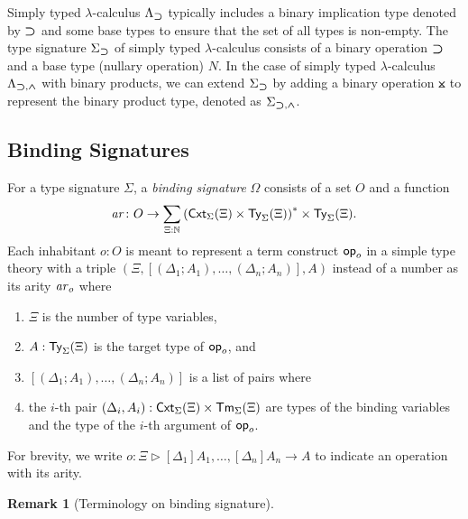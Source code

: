 \documentclass[acmsmall,screen]{acmart}
\theoremstyle{acmdefinition}
\newtheorem{remark}[theorem]{Remark}}
\begin{document}
\begin{example}\label{ex:implication}
  Simply typed $\lambda$-calculus $\Lambda_{\mathbin{\bm{\supset}}}$ typically includes a binary implication type denoted by $\mathbin{\bm{\supset}}$ and some base types to ensure that the set of all types is non-empty.
  The type signature $\Sigma_{\mathbin{\bm{\supset}}}$ of simply typed $\lambda$-calculus consists of a binary operation $\mathbin{\bm{\supset}}$ and a base type (nullary operation) $N$.
  In the case of simply typed $\lambda$-calculus $\Lambda_{\mathbin{\bm{\supset}}, \mathbin{\bm{\wedge}}}$ with binary products, we can extend $\Sigma_{\mathbin{\bm{\supset}}}$ by adding a binary operation $\btimes$ to represent the binary product type, denoted as $\Sigma_{\mathbin{\bm{\supset}}, \mathbin{\bm{\wedge}}}$.
\end{example}

\subsection{Binding Signatures} \label{subsec:binding-sig}
\begin{definition}\label{def:binding-signature}
  For a type signature $\Sigma$, a \emph{binding signature} $\Omega$ consists of a set $O$ and a function
  \[
    \mathit{ar}\colon O \to \sum_{\Xi : \mathbb{N}} \left(\mathsf{Cxt}_\Sigma(\Xi) \times \mathsf{Ty}_\Sigma(\Xi)\right)^* \times \mathsf{Ty}_\Sigma(\Xi).
  \]
  Each inhabitant $o: O$ is meant to represent a term construct $\mathsf{op}_o$ in a simple type theory with a triple $\left(\Xi, \left[\left(\Delta_1; A_1\right), \ldots, \left(\Delta_{n}; A_{n}\right) \right], A\right)$
  instead of a number as its arity $\mathit{ar}_o$ where
  \begin{enumerate}
    \item $\Xi$ is the number of type variables, 
    \item $A : \mathsf{Ty}_\Sigma(\Xi)$ is the target type of $\mathsf{op}_o$, and
    \item $\left[\left(\Delta_1; A_{1}\right), \ldots, \left(\Delta_{n}; A_{n}\right) \right]$ is a list of pairs where
    \item the $i$-th pair $(\Delta_i, A_i) :\mathsf{Cxt}_{\Sigma}(\Xi) \times \mathsf{Tm}_{\Sigma}(\Xi)$ are types of the binding variables and the type of the $i$-th argument of $\mathsf{op}_{o}$.
  \end{enumerate}
  For brevity, we write $o \colon \Xi \rhd [\Delta_1]A_{1}, \ldots, \left[\Delta_{n}\right] A_{n} \to A$ to indicate an operation with its arity. 
\end{definition}
\begin{remark}[Terminology on binding signature]
  \cite{Aczel1978,Fiore2010}
\end{remark}
\end{document}
